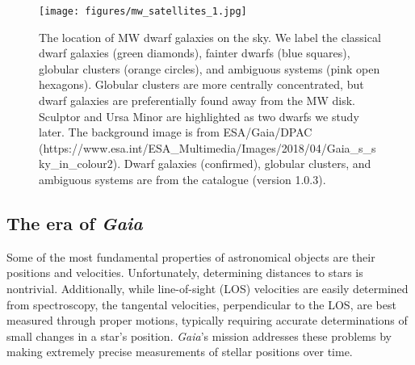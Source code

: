 \begin{figure}
\centering
\texttt{[image: figures/mw\_satellites\_1.jpg]}
\caption[Dwarf galaxies sky position]{The location of MW dwarf galaxies
on the sky. We label the classical dwarf galaxies (green diamonds),
fainter dwarfs (blue squares), globular clusters (orange circles), and
ambiguous systems (pink open hexagons). Globular clusters are more
centrally concentrated, but dwarf galaxies are preferentially found away
from the MW disk. Sculptor and Ursa Minor are highlighted as two dwarfs
we study later. The background image is from ESA/Gaia/DPAC
(https://www.esa.int/ESA\_Multimedia/Images/2018/04/Gaia\_s\_sky\_in\_colour2).
Dwarf galaxies (confirmed), globular clusters, and ambiguous systems are
from the \citet{pace2024} catalogue (version
1.0.3).}\label{fig:mw_satellite_system}
\end{figure}

\subsection{\texorpdfstring{The era of
\emph{Gaia}}{The era of Gaia}}\label{the-era-of-gaia}

Some of the most fundamental properties of astronomical objects are
their positions and velocities. Unfortunately, determining distances to
stars is nontrivial. Additionally, while line-of-sight (LOS) velocities
are easily determined from spectroscopy, the tangental velocities,
perpendicular to the LOS, are best measured through proper motions,
typically requiring accurate determinations of small changes in a star's
position. \emph{Gaia}'s mission addresses these problems by making
extremely precise measurements of stellar positions over time.


